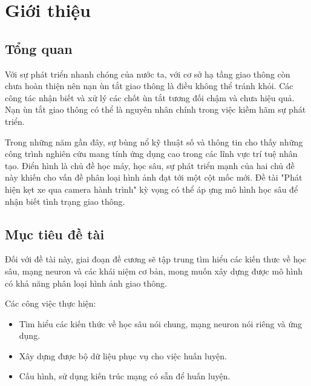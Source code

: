 \chapter{Giới thiệu}

\section{Tổng quan}
	Với sự phát triển nhanh chóng của nước ta, với cơ sở hạ tầng giao thông còn chưa hoàn thiện nên nạn ùn tắt giao thông là điều không thể tránh khỏi. Các công tác nhận biết và xử lý các chốt ùn tắt tương đối chậm và chưa hiệu quả. Nạn ùn tắt giao thông có thể là nguyên nhân chính trong việc kiềm hãm sự phát triển.\par
	Trong những năm gần đây, sự bùng nổ kỹ thuật số và thông tin cho thấy những công trình nghiên cứu mang tính ứng dụng cao trong các lĩnh vực trí tuệ nhân tạo. Điển hình là chủ đề học máy, học sâu, sự phát triển mạnh của hai chủ đề này khiến cho vấn đề phân loại hình ảnh đạt tới một cột mốc mới. Đề tài "Phát hiện kẹt xe qua camera hành trình" kỳ vọng có thể áp ựng mô hình học sâu để nhận biết tình trạng giao thông.
\section{Mục tiêu đề tài}
Đối với đề tài này, giai đoạn đề cương sẽ tập trung tìm hiểu các kiến thưc về học sâu, mạng neuron và các khái niệm cơ bản, mong muốn xây dựng được mô hình có khả năng phân loại hình ảnh giao thông.\par
Các công việc thực hiện:
\begin{itemize}
	\item Tìm hiểu các kiến thức về học sâu nói chung, mạng neuron nói riêng và ứng dụng.
	\item Xây dựng được bộ dữ liệu phục vụ cho việc huấn luyện.
	\item Cấu hình, sử dụng kiến trúc mạng có sẵn để huấn luyện.	
\end{itemize}
